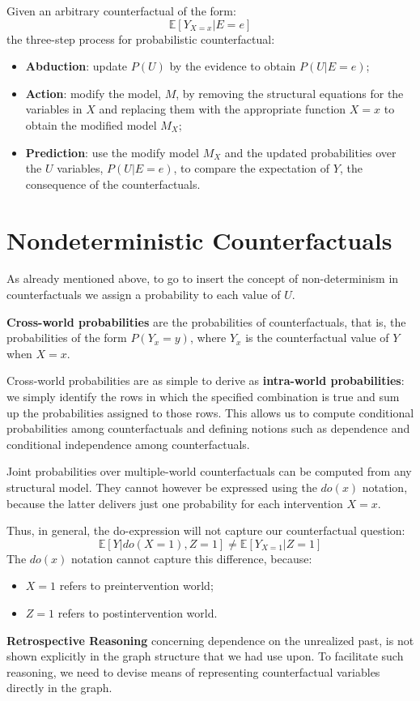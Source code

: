 Given an arbitrary counterfactual of the form:
\begin{equation*}
    \mathbb{E}[Y_{X = x} | E = e]
\end{equation*}
the three-step process for probabilistic counterfactual:
\begin{itemize}
    \item \textbf{Abduction}: update $P(U)$ by the evidence to obtain $P(U| E = e)$;
    \item \textbf{Action}: modify the model, $M$, by removing the structural equations for
          the variables in $X$ and replacing them with the appropriate function
          $X = x$ to obtain the modified model $M_X$;
    \item \textbf{Prediction}: use the modify model $M_X$ and the updated probabilities
          over the $U$ variables, $P(U| E = e)$, to compare the expectation of $Y$,
          the consequence of the counterfactuals.
\end{itemize}
\section{Nondeterministic Counterfactuals}
As already mentioned above, to go to insert the concept of non-determinism in
counterfactuals we assign a probability to each value of $U$.

\textbf{Cross-world probabilities} are the probabilities of counterfactuals, that
is, the probabilities of the form $P(Y_x = y)$, where $Y_x$ is the counterfactual
value of $Y$ when $X = x$.

Cross-world probabilities are as simple to derive as \textbf{intra-world probabilities}:
we simply identify the rows in which the specified combination is true and sum
up the probabilities assigned to those rows. This allows us to compute conditional
probabilities among counterfactuals and defining notions such as dependence and
conditional independence among counterfactuals.

Joint probabilities over multiple-world counterfactuals can be computed from any
structural model. They cannot however be expressed using the $do(x)$ notation,
because the latter delivers just one probability for each intervention $X = x$.

Thus, in general, the do-expression will not capture our counterfactual question:
\begin{equation*}
    \mathbb{E}[Y| do(X = 1), Z = 1] \neq \mathbb{E}[Y_{X = 1} | Z = 1]
\end{equation*}
The $do(x)$ notation cannot capture this difference, because:
\begin{itemize}
    \item $X = 1$ refers to preintervention world;
    \item $Z = 1$ refers to postintervention world.
\end{itemize}

\textbf{Retrospective Reasoning} concerning dependence on the unrealized past, is 
not shown explicitly in the graph structure that we had use upon. To facilitate 
such reasoning, we need to devise means of representing counterfactual variables 
directly in the graph.
